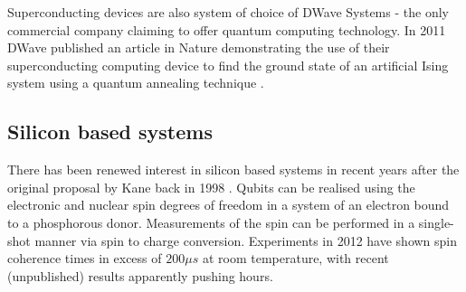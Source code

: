 Superconducting devices are also system of choice of DWave Systems - the only commercial company claiming to offer quantum computing technology. In 2011 DWave published an article in Nature demonstrating the use of their superconducting computing device to find the ground state of an artificial Ising system using a quantum annealing technique \cite{dwave_annealing}.

\subsection{Silicon based systems}

There has been renewed interest in silicon based systems in recent years after the original proposal by Kane back in 1998 \cite{silicon_proposal_98}. Qubits can be realised using the electronic and nuclear spin degrees of freedom in a system of an electron bound to a phosphorous donor. Measurements of the spin can be performed in a single-shot manner via spin to charge conversion. Experiments in 2012 have shown spin coherence times in excess of $200\mu s$ \cite{silicon_qubit, silicon_seconds} at room temperature, with recent (unpublished) results apparently pushing hours.


